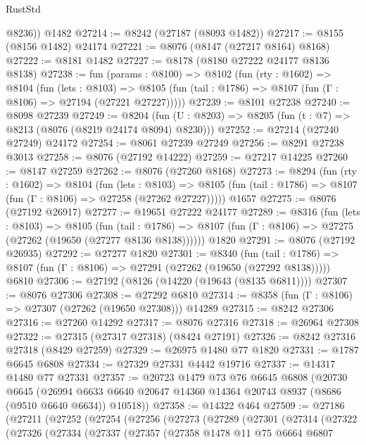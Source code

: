 \begin{lexlean}{RustStd}
\begin{coremodule}
        @8236))
    @1482
@27214 := @8242 (@27187 (@8093 @1482))
@27217 := @8155 (@8156 @1482) @24174
@27221 := @8076 (@8147 (@27217 @8164) @8168)
@27222 := @8181 @1482
@27227 := @8178 (@8180 @27222 @24177 @8136 @8138)
@27238 := fun (params : @8100) =>
  @8102
    (fun (rty : @1602) =>
    @8104
      (fun (lets : @8103) =>
      @8105 (fun (tail : @1786) => @8107 (fun (Γ : @8106) => @27194 (@27221 @27227)))))
@27239 := @8101 @27238
@27240 := @8098 @27239
@27249 := @8204
    (fun (U : @8203) => @8205 (fun (t : @7) => @8213 (@8076 (@8219 @24174 @8094) @8230)))
@27252 := @27214 (@27240 @27249) @24172
@27254 := @8061 @27239 @27249
@27256 := @8291 @27238 @3013
@27258 := @8076 (@27192 @14222)
@27259 := @27217 @14225
@27260 := @8147 @27259
@27262 := @8076 (@27260 @8168)
@27273 := @8294
    (fun (rty : @1602) =>
    @8104
      (fun (lets : @8103) =>
      @8105 (fun (tail : @1786) => @8107 (fun (Γ : @8106) => @27258 (@27262 @27227)))))
    @1657
@27275 := @8076 (@27192 @26917)
@27277 := @19651 @27222 @24177
@27289 := @8316
    (fun (lets : @8103) =>
    @8105
      (fun (tail : @1786) =>
      @8107 (fun (Γ : @8106) => @27275 (@27262 (@19650 (@27277 @8136 @8138))))))
    @1820
@27291 := @8076 (@27192 @26935)
@27292 := @27277 @1820
@27301 := @8340
    (fun (tail : @1786) => @8107 (fun (Γ : @8106) => @27291 (@27262 (@19650 (@27292 @8138)))))
    @6810
@27306 := @27192 (@8126 (@14220 (@19643 (@8135 @6811))))
@27307 := @8076 @27306
@27308 := @27292 @6810
@27314 := @8358 (fun (Γ : @8106) => @27307 (@27262 (@19650 @27308))) @14289
@27315 := @8242 @27306
@27316 := @27260 @14292
@27317 := @8076 @27316
@27318 := @26964 @27308
@27322 := @27315 (@27317 @27318) (@8424 @27191)
@27326 := @8242 @27316 @27318 (@8429 @27259)
@27329 := @26975 @1480 @77 @1820
@27331 := @1787 @6645 @6808
@27334 := @27329 @27331 @4442 @19716
@27337 := @14317 @1480 @77 @27331
@27357 := @20723
    @1479
    @73
    @76
    @6645
    @6808
    (@20730
      @6645
      (@26994 @6633 @6640 @20647 @14360 @14364 @20743 @8937 (@8686 (@9510 @6640 @6634)) @10518))
@27358 := @14322 @464
@27509 := @27186
    (@27211
      (@27252
        (@27254
          (@27256
            (@27273
              (@27289
                (@27301
                  (@27314
                    (@27322
                      (@27326
                        (@27334
                          (@27337
                            (@27357
                              (@27358
                                @1478
                                @11
                                @75
                                @6664
                                @6807

\end{coremodule}
\end{lexlean}
